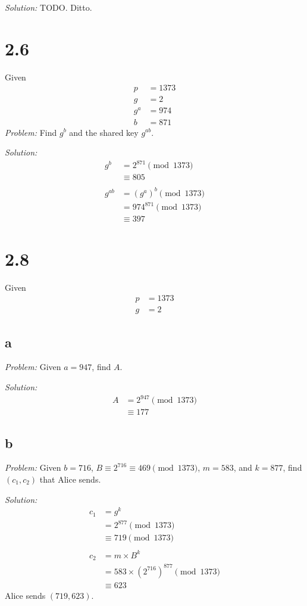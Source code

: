 \documentclass[12pt]{article}
\begin{document}
\textit{Solution:} TODO. Ditto.

\section*{2.6}
Given
\begin{align*}
    p &= 1373 \\
    g &= 2 \\
    g^a &= 974 \\
    b &= 871
\end{align*}
\textit{Problem:} Find $g^b$ and the shared key $g^{ab}$.

\textit{Solution:}
\begin{align*}
    g^b &= 2^{871} \pmod{1373} \\
    &\equiv \boxed{805} \\
    \\
    g^{ab} &= (g^a)^b \pmod{1373} \\
    &= 974^{871} \pmod{1373} \\
    &\equiv \boxed{397}
\end{align*}

\section*{2.8}
Given
\begin{align*}
    p &= 1373 \\
    g &= 2
\end{align*}

\subsection*{a}
\textit{Problem:} Given $a = 947$, find $A$.

\textit{Solution:}
\begin{align*}
    A &= 2^{947} \pmod{1373} \\
    &\equiv \boxed{177}
\end{align*}

\subsection*{b}
\textit{Problem:} Given $b = 716$, $B \equiv 2^{716} \equiv 469 \pmod{1373}$, $m = 583$, and $k = 877$, find $(c_1, c_2)$ that Alice sends.

\textit{Solution:}
\begin{align*}
    c_1 &= g^k \\
    &= 2^{877} \pmod{1373} \\
    &\equiv 719 \pmod{1373} \\
    \\
    c_2 &= m \times B^k \\
    &= 583 \times (2^{716})^{877} \pmod{1373} \\
    &\equiv 623
\end{align*}
Alice sends $\boxed{(719, 623)}$.
\end{document}
